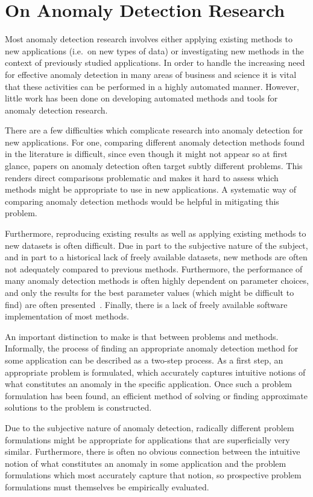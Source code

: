 \section{On Anomaly Detection Research}

Most anomaly detection research involves either applying existing methods to new applications (i.e.\ on new types of data) or investigating new methods in the context of previously studied applications. In order to handle the increasing need for effective anomaly detection in many areas of business and science it is vital that these activities can be performed in a highly automated manner. However, little work has been done on developing automated methods and tools for anomaly detection research.

There are a few difficulties which complicate research into anomaly detection for new applications. For one, comparing different anomaly detection methods found in the literature is difficult, since even though it might not appear so at first glance, papers on anomaly detection often target subtly different problems. This renders direct comparisons problematic and makes it hard to assess which methods might be appropriate to use in new applications. A systematic way of comparing anomaly detection methods would be helpful in mitigating this problem.

Furthermore, reproducing existing results as well as applying existing methods to new datasets is often difficult. Due in part to the subjective nature of the subject, and in part to a historical lack of freely available datasets, new methods are often not adequately compared to previous methods. Furthermore, the performance of many anomaly detection methods is often highly dependent on parameter choices, and only the results for the best parameter values (which might be difficult to find) are often presented~\cite{keogh5}. Finally, there is a lack of freely available software implementation of most methods.

An important distinction to make is that between problems and methods. Informally, the process of finding an appropriate anomaly detection method for some application can be described as a two-step process. As a first step, an appropriate problem is formulated, which accurately captures intuitive notions of what constitutes an anomaly in the specific application. Once such a problem formulation has been found, an efficient method of solving or finding approximate solutions to the problem is constructed.

Due to the subjective nature of anomaly detection, radically different problem formulations might be appropriate for applications that are superficially very similar. Furthermore, there is often no obvious connection between the intuitive notion of what constitutes an anomaly in some application and the problem formulations which most accurately capture that notion, so prospective problem formulations must themselves be empirically evaluated.

